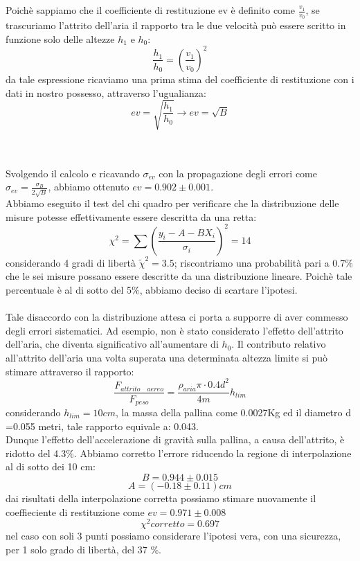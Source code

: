 \documentclass[a4paper]{article}
\theoremstyle{definition}
\begin{document}
	\noindent Poichè sappiamo che il coefficiente di restituzione ev è definito come \(\frac{v_{1}}{v_{0}}\), se trascuriamo l'attrito dell'aria il rapporto tra le due velocità può essere scritto in funzione solo delle altezze \(h_{1}\) e \(h_{0}\):
	\[\frac{h_{1}}{h_{0}} = (\frac{v_{1}}{v_{0}})^{2}\] 
	da tale espressione ricaviamo una prima stima del coefficiente di restituzione con i dati in nostro possesso, attraverso l'ugualianza:
	\[ev = \sqrt{\frac{h_{1}}{h_{0}}} \rightarrow ev = \sqrt{B}\]
	
	\\\\
	Svolgendo il calcolo e ricavando \(\sigma_{ev}\) con la propagazione degli errori come \(\sigma _{ev} = \frac{\sigma _{B}}{2\sqrt{B}}\), abbiamo ottenuto \(ev = 0.902 \pm 0.001\).\\
	\noindent Abbiamo eseguito il test del chi quadro per verificare che la distribuzione delle misure potesse effettivamente essere descritta da una retta:
	\[\chi ^{2} = \sum \left ( \frac{y_{i}-A-BX_{i}}{\sigma_{i}} \right )^{2} = 14\]
	\noindent considerando 4 gradi di libertà \(\tilde{\chi}^{2} = 3.5\); riscontriamo una probabilità pari a 0.7\(\%\) che le sei misure possano essere descritte da una distribuzione lineare. Poichè tale percentuale è al di sotto del 5\(\%\), abbiamo deciso di scartare l'ipotesi.\\\\
	Tale disaccordo con la distribuzione attesa ci porta a supporre di aver commesso degli errori sistematici. Ad esempio, non è stato considerato l'effetto dell'attrito dell'aria, che diventa significativo all'aumentare di \(h_{0}\). Il contributo relativo all'attrito dell'aria una volta superata una determinata altezza limite si può stimare attraverso il rapporto:
	\[\frac{F_{attrito \quad aereo}}{F_{peso}} = \frac{\rho_{aria} \pi \cdot 0.4 d^{2}}{4m}h_{lim}\]
	considerando \(h_{lim} = 10 cm\), la massa della pallina come 0.0027Kg ed il diametro d =0.055 metri, tale rapporto equivale a: 0.043.\\
	Dunque l'effetto dell'accelerazione di gravità sulla pallina, a causa dell'attrito, è ridotto del 4.3\(\%\). Abbiamo corretto l'errore riducendo la regione di interpolazione al di sotto dei 10 cm:
	\[B = 0.944 \pm 0.015\]
	\[A = (-0.18 \pm 0.11) cm\] 
	dai risultati della interpolazione corretta possiamo stimare nuovamente il coeffieciente di restituzione come \(ev = 0.971 \pm 0.008 \)
	\[\chi ^{2}corretto = 0.697\]
	nel caso con soli 3 punti possiamo considerare l'ipotesi vera, con una sicurezza, per 1 solo grado di libertà, del 37 \(\%\). \\\\
	
\end{document}
